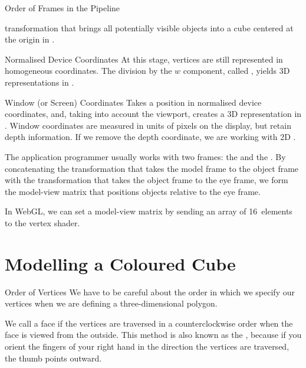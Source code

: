 \documentclass[../COS3712_Notes.tex]{subfiles}
\begin{document}
\begin{sidenote}{Order of Frames in the Pipeline}
\begin{descriptenum}
            transformation that brings all potentially visible objects into a cube centered
            at the origin in .
          \item[Normalised Device Coordinates] At this stage, vertices are still represented
            in homogeneous coordinates.
            The division by the $w$ component, called ,
            yields 3D representations in .
          \item[Window (or Screen) Coordinates] Takes a position in normalised device coordinates,
            and, taking into account the viewport, creates a 3D representation in
            .
            Window coordinates are measured in units of pixels on the display,
            but retain depth information.
            If we remove the depth coordinate, we are working with 2D .
        \end{descriptenum}
      \end{sidenote}

      The application programmer usually works with two frames: the 
      and the .
      By concatenating the transformation that takes the model frame to the object frame
      with the transformation that takes the object frame to the eye frame,
      we form the model-view matrix that positions objects relative to the eye frame.

      In WebGL, we can set a model-view matrix by sending an array of 16~elements to the
      vertex shader.

    \section{Modelling a Coloured Cube}
      \begin{sidenote}{Order of Vertices}
        We have to be careful about the order in which we specify our vertices
        when we are defining a three-dimensional polygon.

        We call a face  if the vertices are traversed in a counterclockwise
        order when the face is viewed from the outside.
        This method is also known as the , because if you orient
        the fingers of your right hand in the direction the vertices are traversed,
        the thumb points outward.
      \end{sidenote}
\end{document}

